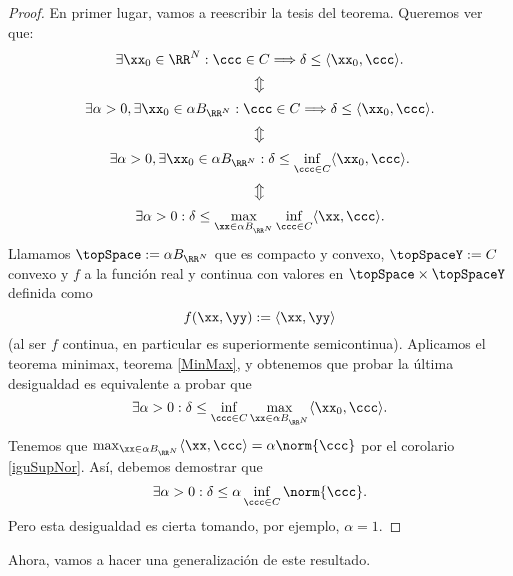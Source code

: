 \begin{proof}
En primer lugar, vamos a reescribir la tesis del teorema. Queremos ver que:
\[
\exists \xx_0 \in \RR^N : \ccc \in C \Longrightarrow \delta \leq \langle \xx_0,\ccc\rangle.
\]
\[
\big\Updownarrow
\]
\[
\exists \alpha > 0, \exists \xx_0 \in \alpha B_{\RR^N} : \ccc \in C \Longrightarrow \delta \leq \langle \xx_0,\ccc\rangle.
\]
\[
\big\Updownarrow
\]
\[
\exists \alpha > 0, \exists \xx_0 \in \alpha B_{\RR^N} : \delta \leq \inf_{\ccc\in C}\langle \xx_0,\ccc\rangle.
\]
\[
\big\Updownarrow
\]
\[
\exists \alpha > 0 : \delta \leq \max_{\xx\in \alpha B_{\RR^N}}\inf_{\ccc\in C}\langle \xx,\ccc\rangle.
\]
Llamamos $ \topSpace := \alpha B_{\RR^N}$ que es compacto y convexo, $ \topSpaceY:= C$ convexo y $ f $ a la función real y continua con valores en $ \topSpace \times \topSpaceY $ definida como \[ f(\xx,\yy):=\langle \xx,\yy \rangle \] (al ser $ f $ continua, en particular es superiormente semicontinua). Aplicamos el teorema minimax, teorema \ref{MinMax}, y obtenemos que probar la última desigualdad es equivalente a probar que
\[
\exists \alpha > 0 : \delta \leq \inf_{\ccc\in C}\max_{\xx\in \alpha B_{\RR^N}}\langle \xx_0,\ccc\rangle.
\]
Tenemos que $ \max_{\xx\in \alpha B_{\RR^N}}\langle \xx,\ccc\rangle = \alpha \norm{\ccc} $ por el corolario \ref{iguSupNor}. Así, debemos demostrar que
\[
\exists \alpha > 0 : \delta \leq \alpha \inf_{\ccc\in C}  \norm{\ccc}.
\]
Pero esta desigualdad es cierta tomando, por ejemplo, $ \alpha = 1 $.
\end{proof}
\bigskip

Ahora, vamos a hacer una generalización de este resultado.

